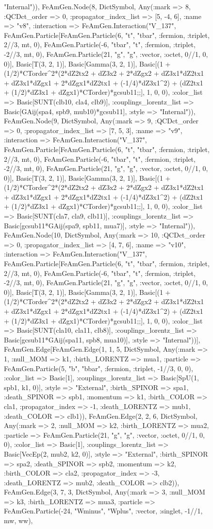 \documentclass{revtex4}
\begin{document}
\begin{figure}[!htb]
\begin{center}
{"Internal")), FeAmGen.Node(8, Dict{Symbol, Any}(:mark => 8, :QCDct_order => 0, :propagator_index_list => [5, -4, 6], :name => "v8", :interaction => FeAmGen.Interaction("V_137", FeAmGen.Particle[FeAmGen.Particle(6, "t", "tbar", :fermion, :triplet, 2//3, mt, 0), FeAmGen.Particle(-6, "tbar", "t", :fermion, :triplet, -2//3, mt, 0), FeAmGen.Particle(21, "g", "g", :vector, :octet, 0//1, 0, 0)], Basic[T(3, 2, 1)], Basic[Gamma(3, 2, 1)], Basic[(1 + (1/2)*CTorder^2*(2*dZ2tx2 + dZ3x2 + 2*dZgx2 + dZ3x1*dZ2tx1 + dZ3x1*dZgx1 + 2*dZgx1*dZ2tx1 + (-1/4)*dZ3x1^2) + (dZ2tx1 + (1/2)*dZ3x1 + dZgx1)*CTorder)*gcsub11;;], 1, 0, 0), :color_list => Basic[SUNT(clb10, cla4, clb9)], :couplings_lorentz_list => Basic[GAij(spa4, spb9, mub10)*gcsub11], :style => "Internal")), FeAmGen.Node(9, Dict{Symbol, Any}(:mark => 9, :QCDct_order => 0, :propagator_index_list => [7, 5, 3], :name => "v9", :interaction => FeAmGen.Interaction("V_137", FeAmGen.Particle[FeAmGen.Particle(6, "t", "tbar", :fermion, :triplet, 2//3, mt, 0), FeAmGen.Particle(-6, "tbar", "t", :fermion, :triplet, -2//3, mt, 0), FeAmGen.Particle(21, "g", "g", :vector, :octet, 0//1, 0, 0)], Basic[T(3, 2, 1)], Basic[Gamma(3, 2, 1)], Basic[(1 + (1/2)*CTorder^2*(2*dZ2tx2 + dZ3x2 + 2*dZgx2 + dZ3x1*dZ2tx1 + dZ3x1*dZgx1 + 2*dZgx1*dZ2tx1 + (-1/4)*dZ3x1^2) + (dZ2tx1 + (1/2)*dZ3x1 + dZgx1)*CTorder)*gcsub11;;], 1, 0, 0), :color_list => Basic[SUNT(cla7, cla9, clb11)], :couplings_lorentz_list => Basic[gcsub11*GAij(spa9, spb11, mua7)], :style => "Internal")), FeAmGen.Node(10, Dict{Symbol, Any}(:mark => 10, :QCDct_order => 0, :propagator_index_list => [4, 7, 6], :name => "v10", :interaction => FeAmGen.Interaction("V_137", FeAmGen.Particle[FeAmGen.Particle(6, "t", "tbar", :fermion, :triplet, 2//3, mt, 0), FeAmGen.Particle(-6, "tbar", "t", :fermion, :triplet, -2//3, mt, 0), FeAmGen.Particle(21, "g", "g", :vector, :octet, 0//1, 0, 0)], Basic[T(3, 2, 1)], Basic[Gamma(3, 2, 1)], Basic[(1 + (1/2)*CTorder^2*(2*dZ2tx2 + dZ3x2 + 2*dZgx2 + dZ3x1*dZ2tx1 + dZ3x1*dZgx1 + 2*dZgx1*dZ2tx1 + (-1/4)*dZ3x1^2) + (dZ2tx1 + (1/2)*dZ3x1 + dZgx1)*CTorder)*gcsub11;;], 1, 0, 0), :color_list => Basic[SUNT(cla10, cla11, clb8)], :couplings_lorentz_list => Basic[gcsub11*GAij(spa11, spb8, mua10)], :style => "Internal"))], FeAmGen.Edge[FeAmGen.Edge(1, 1, 5, Dict{Symbol, Any}(:mark => 1, :null_MOM => k1, :birth_LORENTZ => mua1, :particle => FeAmGen.Particle(5, "b", "bbar", :fermion, :triplet, -1//3, 0, 0), :color_list => Basic[1], :couplings_lorentz_list => Basic[SpU(1, spb1, k1, 0)], :style => "External", :birth_SPINOR => spa1, :death_SPINOR => spb1, :momentum => k1, :birth_COLOR => cla1, :propagator_index => -1, :death_LORENTZ => mub1, :death_COLOR => clb1)), FeAmGen.Edge(2, 2, 6, Dict{Symbol, Any}(:mark => 2, :null_MOM => k2, :birth_LORENTZ => mua2, :particle => FeAmGen.Particle(21, "g", "g", :vector, :octet, 0//1, 0, 0), :color_list => Basic[1], :couplings_lorentz_list => Basic[VecEp(2, mub2, k2, 0)], :style => "External", :birth_SPINOR => spa2, :death_SPINOR => spb2, :momentum => k2, :birth_COLOR => cla2, :propagator_index => -3, :death_LORENTZ => mub2, :death_COLOR => clb2)), FeAmGen.Edge(3, 7, 3, Dict{Symbol, Any}(:mark => 3, :null_MOM => k3, :birth_LORENTZ => mua3, :particle => FeAmGen.Particle(-24, "Wminus", "Wplus", :vector, :singlet, -1//1, mw, ww), }
\end{center}
\end{figure}
\end{document}
